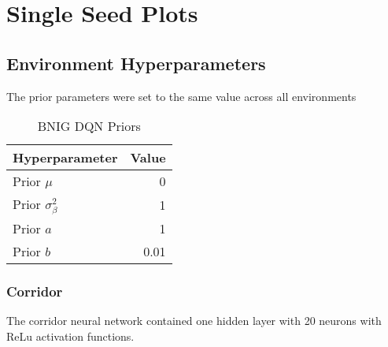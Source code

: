{{\chapter{Single Seed Plots}

\section{Environment Hyperparameters}

The prior parameters were set to the same value across all environments


\begin{table}[H]
    \centering
    \begin{tabular}{@{}lr@{}}
        \toprule
        Hyperparameter               & Value \\ \midrule
        Prior $\mu$                  & 0 \\
        Prior $\sigma_\beta^2$       & 1 \\
        Prior $a$                    & 1 \\
        Prior $b$                    & 0.01\\ \bottomrule
    \end{tabular}
    \caption{BNIG DQN Priors}
\end{table}

\subsection{Corridor}

The corridor neural network contained one hidden layer with 20 neurons with ReLu activation functions.

}}
